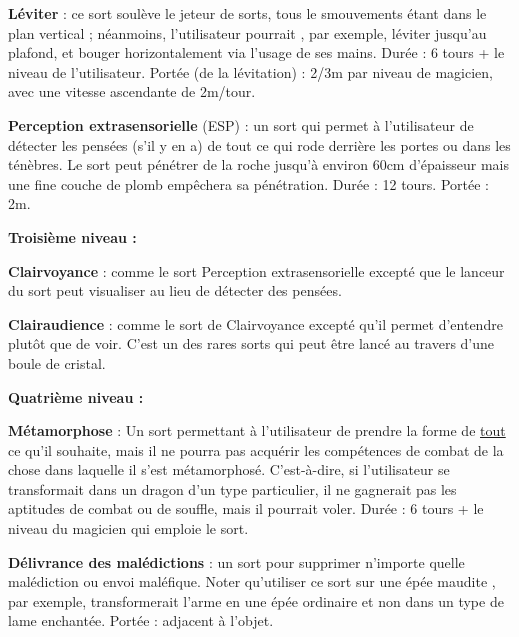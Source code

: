 \bigskip

\label{sort-levitation} \textbf{Léviter} : ce sort soulève le jeteur de sorts, tous le smouvements étant dans le plan vertical ; néanmoins, l'utilisateur pourrait , par exemple, léviter jusqu'au plafond, et bouger horizontalement via l'usage de ses mains. Durée : 6 tours + le niveau de l'utilisateur. Portée (de la lévitation) : 2/3m par niveau de magicien, avec une vitesse ascendante de 2m/tour.

\bigskip

\label{sort-esp}\textbf{Perception extrasensorielle} (ESP) : un sort qui permet à l'utilisateur de détecter les pensées (s'il y en a) de tout ce qui rode derrière les portes ou dans les ténèbres. Le sort peut pénétrer de la roche jusqu'à environ 60cm d'épaisseur mais une fine couche de plomb empêchera sa pénétration. Durée : 12 tours. Portée : 2m.

\bigskip

\textbf{Troisième niveau :}

\bigskip

\label{sort-clairvoyance}\textbf{Clairvoyance} : comme le sort Perception extrasensorielle excepté que le lanceur du sort peut visualiser au lieu de détecter des pensées.

\bigskip

\label{sort-clairaudience}\textbf{Clairaudience} : comme le sort de Clairvoyance excepté qu'il permet d'entendre plutôt que de voir. C'est un des rares sorts qui peut être lancé au travers d'une boule de cristal.

\bigskip

\textbf{Quatrième niveau :}

\bigskip

\label{sort-metamorphose}\textbf{Métamorphose} : Un sort permettant à l'utilisateur de prendre la forme de \underline{tout} ce qu'il souhaite, mais il ne pourra pas acquérir les compétences de combat de la chose dans laquelle il s'est métamorphosé. C'est-à-dire, si l'utilisateur se transformait dans un dragon d'un type particulier, il ne gagnerait pas les aptitudes de combat ou de souffle, mais il pourrait voler. Durée : 6 tours + le niveau du magicien qui emploie le sort.

\bigskip

\label{sort-delivrance-malediction}\textbf{Délivrance des malédictions} : un sort pour supprimer n'importe quelle malédiction ou envoi maléfique. Noter qu'utiliser ce sort sur une \og épée maudite \fg{}, par exemple, transformerait l'arme en une épée ordinaire et non dans un type de lame enchantée. Portée : adjacent à l'objet.

